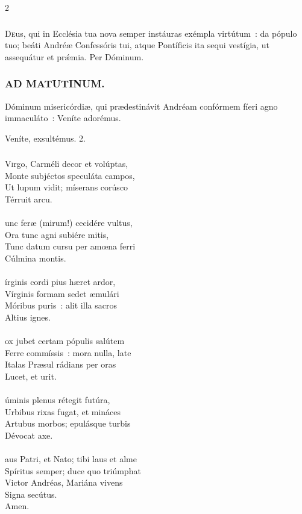 \documentclass[9pt,twoside]{extarticle}
\begin{document}
\begin{multicols}{2}
{{{\subsubsection*{\center {}}
\lettrine{D}eus, qui in Ecclésia tua nova semper instáuras exémpla virtútum~: da pópulo tuo; beáti Andréæ Confessóris tui, atque Pontíficis ita sequi vestígia, ut assequátur et prǽmia. Per Dóminum.

\subsubsection*{\center \textsc{AD MATUTINUM.}}
\begin{tightlist}{}
\item {} Dóminum misericórdiæ, qui prædestinávit Andréam confórmem fíeri agno immaculáto~: \textred{*} Veníte adorémus.
\item {} Veníte, exsultémus. 2.
\end{tightlist}

\subsubsection*{\center {}}
\lettrine{V}irgo, Carméli decor et volúptas,\\
Monte subjéctos speculáta campos,\\
Ut lupum vidit; míserans corúsco\\
Térruit arcu.\\
\\
unc feræ (mirum!) cecidére vultus,\\
Ora tunc agni subiére mitis,\\
Tunc datum cursu per amœna ferri\\
Cúlmina montis.\\
\\
írginis cordi pius hæret ardor,\\
Vírginis formam sedet æmulári\\
Móribus puris~: alit illa sacros\\
Altius ignes.\\
\\
ox jubet certam pópulis salútem\\
Ferre commíssis~: mora nulla, late\\
Italas Præsul rádians per oras\\
Lucet, et urit.\\
\\
úminis plenus rétegit futúra,\\
Urbibus rixas fugat, et mináces\\
Artubus morbos; epulásque turbis\\
Dévocat axe.\\
\\
aus Patri, et Nato; tibi laus et alme\\
Spíritus semper; duce quo triúmphat\\
Victor Andréas, Mariána vivens\\
Signa secútus.\\
Amen.

}}}
\end{multicols}
\end{document}
